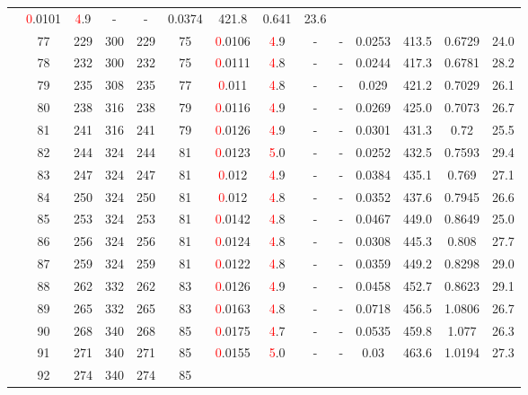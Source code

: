 \begin{table}[htb]
{\begin{tabular}{|c|c|c|c|c|c|c|c|c|c|c|c|c|c|}
 & \textcolor{red}0.0101 & \textcolor{red}4.9
 & - & -
 & 0.0374 & 421.8
 & 0.641 & 23.6
 \\
 & 
77 & 229 & 300 & 229 & 75
 & \textcolor{red}0.0106 & \textcolor{red}4.9
 & - & -
 & 0.0253 & 413.5
 & 0.6729 & 24.0
 \\
 & 
78 & 232 & 300 & 232 & 75
 & \textcolor{red}0.0111 & \textcolor{red}4.8
 & - & -
 & 0.0244 & 417.3
 & 0.6781 & 28.2
 \\
 & 
79 & 235 & 308 & 235 & 77
 & \textcolor{red}0.011 & \textcolor{red}4.8
 & - & -
 & 0.029 & 421.2
 & 0.7029 & 26.1
 \\
 & 
80 & 238 & 316 & 238 & 79
 & \textcolor{red}0.0116 & \textcolor{red}4.9
 & - & -
 & 0.0269 & 425.0
 & 0.7073 & 26.7
 \\
 & 
81 & 241 & 316 & 241 & 79
 & \textcolor{red}0.0126 & \textcolor{red}4.9
 & - & -
 & 0.0301 & 431.3
 & 0.72 & 25.5
 \\
 & 
82 & 244 & 324 & 244 & 81
 & \textcolor{red}0.0123 & \textcolor{red}5.0
 & - & -
 & 0.0252 & 432.5
 & 0.7593 & 29.4
 \\
 & 
83 & 247 & 324 & 247 & 81
 & \textcolor{red}0.012 & \textcolor{red}4.9
 & - & -
 & 0.0384 & 435.1
 & 0.769 & 27.1
 \\
 & 
84 & 250 & 324 & 250 & 81
 & \textcolor{red}0.012 & \textcolor{red}4.8
 & - & -
 & 0.0352 & 437.6
 & 0.7945 & 26.6
 \\
 & 
85 & 253 & 324 & 253 & 81
 & \textcolor{red}0.0142 & \textcolor{red}4.8
 & - & -
 & 0.0467 & 449.0
 & 0.8649 & 25.0
 \\
 & 
86 & 256 & 324 & 256 & 81
 & \textcolor{red}0.0124 & \textcolor{red}4.8
 & - & -
 & 0.0308 & 445.3
 & 0.808 & 27.7
 \\
 & 
87 & 259 & 324 & 259 & 81
 & \textcolor{red}0.0122 & \textcolor{red}4.8
 & - & -
 & 0.0359 & 449.2
 & 0.8298 & 29.0
 \\
 & 
88 & 262 & 332 & 262 & 83
 & \textcolor{red}0.0126 & \textcolor{red}4.9
 & - & -
 & 0.0458 & 452.7
 & 0.8623 & 29.1
 \\
 & 
89 & 265 & 332 & 265 & 83
 & \textcolor{red}0.0163 & \textcolor{red}4.8
 & - & -
 & 0.0718 & 456.5
 & 1.0806 & 26.7
 \\
 & 
90 & 268 & 340 & 268 & 85
 & \textcolor{red}0.0175 & \textcolor{red}4.7
 & - & -
 & 0.0535 & 459.8
 & 1.077 & 26.3
 \\
 & 
91 & 271 & 340 & 271 & 85
 & \textcolor{red}0.0155 & \textcolor{red}5.0
 & - & -
 & 0.03 & 463.6
 & 1.0194 & 27.3
 \\
 & 
92 & 274 & 340 & 274 & 85

\end{tabular}}
\end{table}
